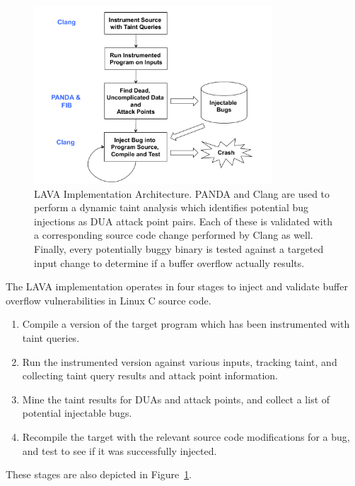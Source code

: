 
\begin{figure}
\centering
\includegraphics[width=3.5in]{lava-arch.pdf}
\caption{LAVA Implementation Architecture.  PANDA and Clang  are used to perform a dynamic taint analysis which identifies potential bug injections as DUA attack point pairs.
Each of these is validated with a corresponding source code change performed by Clang  as well.
Finally, every potentially buggy binary is tested against a targeted input change to determine if a buffer overflow actually results.}
\label{fig:lava-impl}
\end{figure}



The LAVA implementation operates in four stages to inject and validate buffer overflow vulnerabilities in Linux C source code. 

\begin{enumerate}
\item Compile a version of the target program which has been instrumented with taint queries.
\item Run the instrumented version against various inputs, tracking taint, and collecting taint query results and attack point information.
\item Mine the taint results for DUAs and attack points, and collect a list of potential injectable bugs.
\item Recompile the target with the relevant source code modifications for a bug, and test to see if it was successfully injected.
\end{enumerate}

These stages are also depicted in Figure~\ref{fig:lava-impl}.

